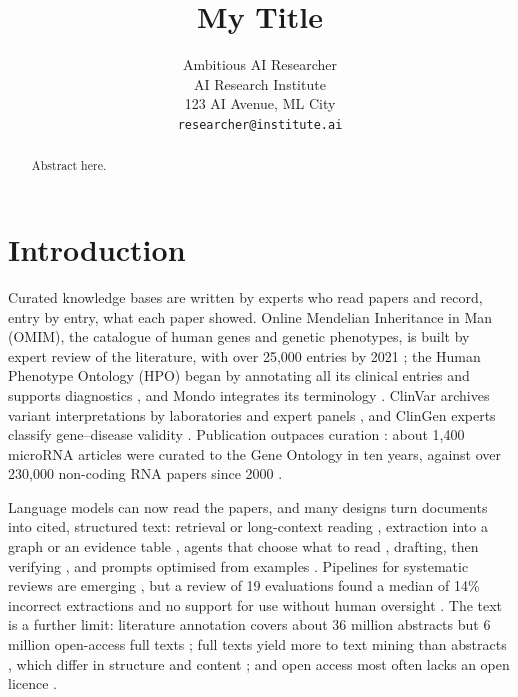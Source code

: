 \documentclass{article} %
\title{My Title}
\author{Ambitious AI Researcher\\
AI Research Institute\\
123 AI Avenue, ML City\\
\texttt{researcher@institute.ai}
}
\begin{document}
\maketitle

\begin{abstract}
Abstract here.
\end{abstract}

\section{Introduction}
\label{sec:intro}
Curated knowledge bases are written by experts who read papers and record, entry by entry, what each paper showed. Online Mendelian Inheritance in Man (OMIM), the catalogue of human genes and genetic phenotypes, is built by expert review of the literature, with over 25,000 entries by 2021 \citep{Amberger2014OmimorgOnline,amberger2019omim,hamosh2021online}; the Human Phenotype Ontology (HPO) began by annotating all its clinical entries \citep{robinson2008human} and supports diagnostics \citep{gargano2024human,Khler2009ClinicalDiagnostics}, and Mondo integrates its terminology \citep{vasilevsky2026mondo}. ClinVar archives variant interpretations by laboratories and expert panels \citep{Landrum2017ClinvarImproving,landrum2025clinvar}, and ClinGen experts classify gene--disease validity \citep{strande2017evaluating}. Publication outpaces curation \citep{caufield2024curategpt,Green2023LitsummLarge}: about 1,400 microRNA articles were curated to the Gene Ontology in ten years, against over 230,000 non-coding RNA papers since 2000 \citep{Green2026GoflowllmcuratingMirna}.

Language models can now read the papers, and many designs turn documents into cited, structured text: retrieval \citep{Lewis2020RetrievalaugmentedGeneration} or long-context reading \citep{li2024retrieval}, extraction into a graph \citep{edge2024local} or an evidence table \citep{joshi2026sliders}, agents that choose what to read \citep{Lla2023PaperqaRetrievalaugmented,skarlinski2024language}, drafting, then verifying \citep{dhuliawala2024chainofverification}, and prompts optimised from examples \citep{agrawal2026gepa}. Pipelines for systematic reviews are emerging \citep{scherbakov2025emergence,cao2025automation,wang2025accelerating}, but a review of 19 evaluations found a median of 14\% incorrect extractions and no support for use without human oversight \citep{Clark2025GenerativeArtificial}. The text is a further limit: literature annotation covers about 36 million abstracts but 6 million open-access full texts \citep{wei2024pubtator}; full texts yield more to text mining than abstracts \citep{Westergaard2018ComprehensiveQuantitative,Wei2019PubtatorCentral}, which differ in structure and content \citep{Cohen2010StructuralContent}; and open access most often lacks an open licence \citep{Piwowar2018StateOa}.
\end{document}

